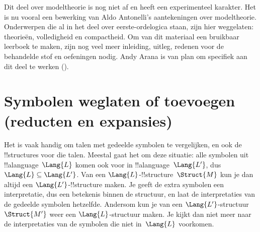 \documentclass[openany]{memoir}
\begin{document}

\begin{editorial}
  Dit deel over modeltheorie is nog niet af en heeft een experimenteel
  karakter. Het is nu vooral een bewerking van Aldo Antonelli's aantekeningen
  over modeltheorie. Onderwerpen die al in het deel over eerste-ordelogica
  staan, zijn hier weggelaten: theorieën, volledigheid en compactheid. Om van
  dit materiaal een bruikbaar leerboek te maken, zijn nog veel meer inleiding,
  uitleg, redenen voor de behandelde stof en oefeningen nodig. Andy Arana is
  van plan om specifiek aan dit deel te werken ().
\end{editorial}
\endgroup

\begingroup
\def\olfilename{OLP-0183}
\def\olfilepath{content/model-theory/basics/}
\hypertarget{unit-OLP-0183}{}



\endgroup

\begingroup
\def\olfilename{OLP-0184}
\def\olfilepath{content/model-theory/basics/}
\hypertarget{unit-OLP-0184}{}



\section{Symbolen weglaten of toevoegen (reducten en expansies)}

Het is vaak handig om talen met gedeelde symbolen te vergelijken, en
ook de !!{structure}s voor die talen. Meestal gaat het om deze
situatie: alle symbolen uit !!a{language}~$\Lang{L}$ komen ook voor in
!!a{language}~$\Lang{L'}$, dus $\Lang{L} \subseteq \Lang{L'}$. Van een
$\Lang{L}$-!!{structure}~$\Struct{M}$ kun je dan altijd een
$\Lang{L'}$-!!{structure} maken. Je geeft de extra symbolen een
interpretatie, dus een betekenis binnen de structuur, en laat de
interpretaties van de gedeelde symbolen hetzelfde. Andersom kun je van
een $\Lang{L'}$-structuur~$\Struct{M'}$ weer een
$\Lang{L}$-structuur maken. Je kijkt dan niet meer naar de
interpretaties van de symbolen die niet in~$\Lang{L}$ voorkomen.
\end{document}
